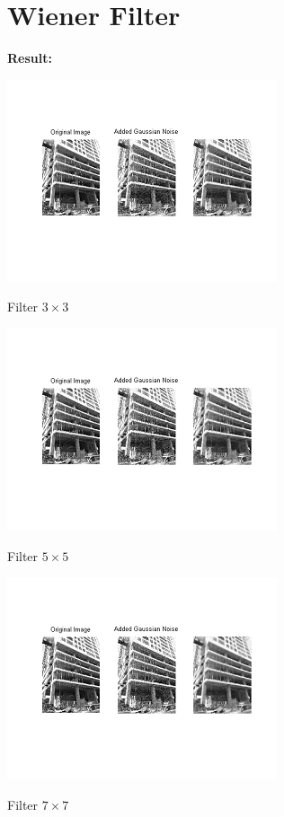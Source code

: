 \section{Wiener Filter}


\textbf{Result:}
\vspace{1cm}
\begin{center}
\includegraphics{Wienec3.png}

Filter $3\times3$

\includegraphics{Wienec5.png}

Filter $5\times5$

\includegraphics{Wienec7.png}

Filter $7\times7$

\end{center}






